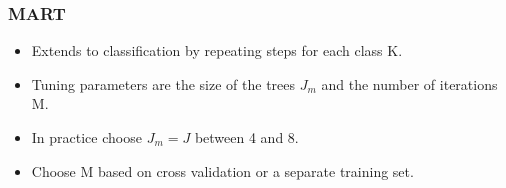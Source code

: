\documentclass{beamer}
\begin{document}
\begin{frame}
	\frametitle{MART}
\begin{itemize}
	\item Extends to classification by repeating steps for each class K.
	\item Tuning parameters are the size of the trees $J_m$ and the number of iterations M.
	\item In practice choose $J_m = J$ between 4 and 8.
	\item Choose M based on cross validation or a separate training set.  

\end{itemize}
\end{frame}
\end{document}

